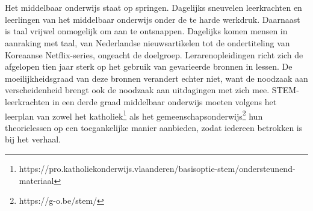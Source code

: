 
\chapter{}%
\label{ch:inleiding}



Het middelbaar onderwijs staat op springen. Dagelijks sneuvelen leerkrachten en leerlingen van het middelbaar onderwijs onder de te harde werkdruk. Daarnaast is taal vrijwel onmogelijk om aan te ontsnappen. Dagelijks komen mensen in aanraking met taal, van Nederlandse nieuwsartikelen tot de ondertiteling van Koreaanse Netflix-series, ongeacht de doelgroep. Lerarenopleidingen richt zich de afgelopen tien jaar sterk op het gebruik van gevarieerde bronnen in lessen. De moeilijkheidsgraad van deze bronnen verandert echter niet, want de noodzaak aan verscheidenheid brengt ook de noodzaak aan uitdagingen met zich mee. STEM-leerkrachten in een derde graad middelbaar onderwijs moeten volgens het leerplan van zowel het katholiek\footnote{https://pro.katholiekonderwijs.vlaanderen/basisoptie-stem/ondersteunend-materiaal} als het gemeenschapsonderwijs\footnote{https://g-o.be/stem/} hun theorielessen op een toegankelijke manier aanbieden, zodat iedereen betrokken is bij het verhaal.

